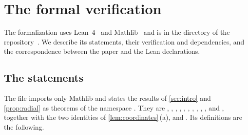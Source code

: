 \section{The formal verification}\label{app:formal}

The formalization uses Lean~4~\cite{Lean4} and Mathlib~\cite{Mathlib20} and is in the directory
 of the repository~\cite{Companion}. We describe its
statements, their verification and dependencies, and the correspondence between the paper and
the Lean declarations.

\subsection{The statements}\label{app:formal-statements}

{\sloppy
The file  imports only Mathlib and states the
results of \cref{sec:intro} and \cref{prop:radial} as theorems of the namespace
. They are , ,
, , , ,
, , , ,
 and , together with the two identities of
\cref{lem:coordinates}\,(a),  and . Its definitions are
the following.\par}
